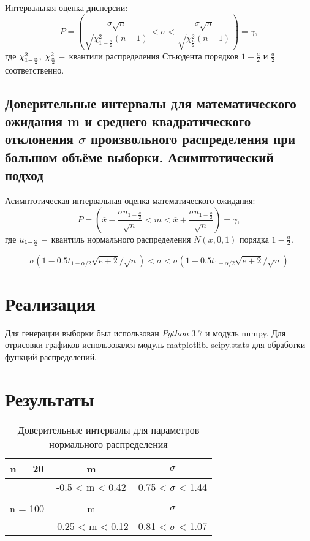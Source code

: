 \documentclass[a4]{article}
\begin{document}
		Интервальная оценка дисперсии:
		$$
		P=\left(\frac{\sigma\sqrt{n}}{\sqrt{\chi^2_{1-\frac{a}{2}}(n-1)}}<\sigma<\frac{\sigma\sqrt{n}}{\sqrt{\chi^2_\frac{a}{2}(n-1)}}\right) = \gamma,
		$$
		где $\chi_{1-\frac{a}{2}}^2,\;\chi_\frac{a}{2}^2\;\--$ квантили распределения Стьюдента порядков $1-\frac{a}{2}$ и $\frac{a}{2}$ соответственно.
		\subsection{Доверительные интервалы для математического ожидания m и среднего квадратического отклонения $\sigma$ произвольного распределения при большом объёме выборки. Асимптотический подход}
		
		Асимптотическая интервальная оценка математического ожидания:
		$$P = \left(\overline{x}-\frac{\sigma u_{1-\frac{a}{2}}}{\sqrt{n}}<m<\overline{x}+\frac{\sigma u_{1-\frac{a}{2}}}{\sqrt{n}}\right)=\gamma,
		$$
		где $u_{1-\frac{a}{2}}\;\--$ квантиль нормального распределения $N(x,0,1)$ порядка $1-\frac{a}{2}.$
		
		$$\sigma(1 - 0.5t_{1 - \alpha/2} \sqrt{e + 2}/ \sqrt{n}) < \sigma < \sigma(1 + 0.5t_{1 - \alpha/2} \sqrt{e + 2}/ \sqrt{n})$$
		
	\section{Реализация}
	Для генерации выборки был использован $Python\;3.7$ и модуль numpy. Для отрисовки графиков использовался модуль matplotlib. scipy.stats для обработки функций распределений.
	
	\section{Результаты}
		\begin{table}[h!]
			
			\caption{Доверительные интервалы для параметров нормального распределения}
			\label{tab:my_label}
			\begin{center}
				\vspace{5mm}
				
				\begin{tabular}{|c|c|c|}
					\hline
					n = 20 & m & $\sigma$\\
					\hline
					& -0.5 < m < 0.42 & 0.75 < $\sigma$ < 1.44\\ 
					\hline
					& &\\
					\hline
					n = 100 & m & $\sigma$\\
					\hline
					& -0.25 < m < 0.12 & 0.81 < $\sigma$ < 1.07\\
					\hline
				\end{tabular}
			\end{center}
		\end{table}
		
\end{document}
